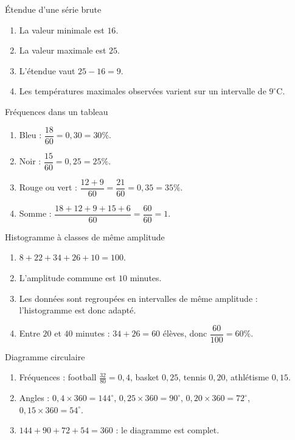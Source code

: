\documentclass[11pt,a4paper]{article}
\newcounter{corr}
\begin{document}
\begin{corrbox}{Étendue d'une série brute}
\begin{enumerate}
\item La valeur minimale est $16$.
\item La valeur maximale est $25$.
\item L'étendue vaut $25-16=9$.
\item Les températures maximales observées varient sur un intervalle de $9^\circ$C.
\end{enumerate}
\end{corrbox}

\begin{corrbox}{Fréquences dans un tableau}
\begin{enumerate}
\item Bleu : $\dfrac{18}{60}=0{,}30=30\%$.
\item Noir : $\dfrac{15}{60}=0{,}25=25\%$.
\item Rouge ou vert : $\dfrac{12+9}{60}=\dfrac{21}{60}=0{,}35=35\%$.
\item Somme : $\dfrac{18+12+9+15+6}{60}=\dfrac{60}{60}=1$.
\end{enumerate}
\end{corrbox}

\begin{corrbox}{Histogramme à classes de même amplitude}
\begin{enumerate}
\item $8+22+34+26+10=100$.
\item L'amplitude commune est $10$ minutes.
\item Les données sont regroupées en intervalles de même amplitude : l'histogramme est donc adapté.
\item Entre $20$ et $40$ minutes : $34+26=60$ élèves, donc $\dfrac{60}{100}=60\%$.
\end{enumerate}
\end{corrbox}

\begin{corrbox}{Diagramme circulaire}
\begin{enumerate}
\item Fréquences : football $\frac{32}{80}=0{,}4$, basket $0{,}25$, tennis $0{,}20$, athlétisme $0{,}15$.
\item Angles : $0{,}4\times360=144^\circ$, $0{,}25\times360=90^\circ$, $0{,}20\times360=72^\circ$, $0{,}15\times360=54^\circ$.
\item $144+90+72+54=360$ : le diagramme est complet.
\end{enumerate}
\end{corrbox}
\end{document}
